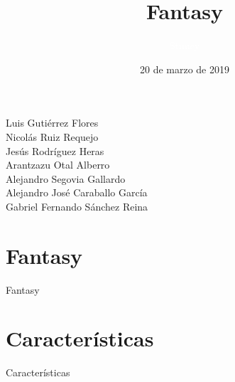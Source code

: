 \documentclass{beamer}
\title{Fantasy}
\author{\textcolor{white}{Stimey}}
\date{20 de marzo de 2019}
\begin{document}
\begin{frame}
  \titlepage
  \begin{center}
  Luis Gutiérrez Flores\\
Nicolás Ruiz Requejo\\
Jesús Rodríguez Heras\\
Arantzazu Otal Alberro\\
Alejandro Segovia Gallardo\\
Alejandro José Caraballo García\\
Gabriel Fernando Sánchez Reina	
  \end{center}
  
\end{frame}


\section{Fantasy}
\begin{frame}{Fantasy}
\end{frame}

\section{Características}
\begin{frame}{Características}
\end{frame}
\end{document}
